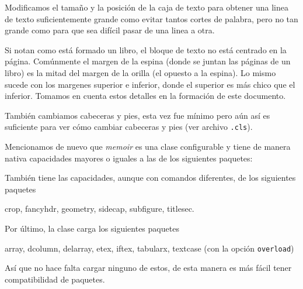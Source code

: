 Modificamos el tamaño y la posición de la caja de texto para obtener una linea de texto suficientemente grande como evitar tantos cortes de palabra, pero no tan grande como para que sea difícil pasar de una linea a otra.

Si notan como está formado un libro, el bloque de texto no está centrado
en la página. Comúnmente el margen de la espina (donde se juntan las
páginas de un libro) es la mitad del margen de la orilla (el opuesto a
la espina). Lo mismo sucede con los margenes superior e inferior, donde el
superior es más chico que el inferior. Tomamos en cuenta estos detalles en
la formación de este documento.

También cambiamos cabeceras y pies, esta vez fue mínimo pero aún así es
suficiente para ver cómo cambiar cabeceras y pies (ver archivo \texttt{.cls}).

Mencionamos de nuevo que \textit{memoir} es una clase configurable y tiene de
manera nativa capacidades mayores o iguales a
las de los siguientes paquetes:
\begin{center}
\end{center}%
También tiene las capacidades, aunque con comandos diferentes, de los siguientes paquetes
\begin{center}
  crop, fancyhdr, geometry, sidecap, subfigure, titlesec.
\end{center}
Por último, la clase carga los siguientes paquetes
\begin{center}
  array, dcolumn, delarray, etex, iftex, tabularx, textcase (con la opción \texttt{overload})
\end{center}
Así que no hace falta cargar ninguno de estos, de esta manera es más fácil
tener compatibilidad de paquetes.

